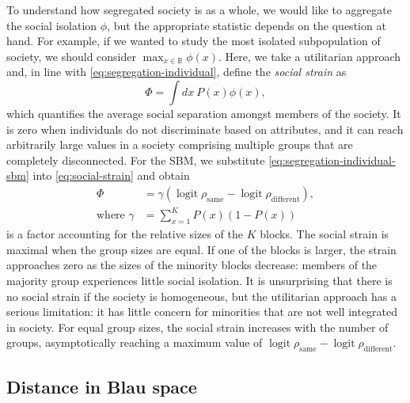 \documentclass{scrartcl}
\DeclareMathOperator{\logit}{logit}
\newcommand{\blauspace}{\mathbb{B}}
\begin{document}
To understand how segregated society is as a whole, we would like to aggregate the social isolation $\phi$, but the appropriate statistic depends on the question at hand. For example, if we wanted to study the most isolated subpopulation of society, we should consider $\max_{x\in\blauspace}\phi(x)$. Here, we take a utilitarian approach and, in line with \cref{eq:segregation-individual}, define the \emph{social strain} as
\begin{equation}
    \Phi = \int dx\ P(x) \phi(x),\label{eq:social-strain}
\end{equation}
which quantifies the average social separation amongst members of the society. It is zero when individuals do not discriminate based on attributes, and it can reach arbitrarily large values in a society comprising multiple groups that are completely disconnected. For the SBM, we substitute \cref{eq:segregation-individual-sbm} into \cref{eq:social-strain} and obtain
\begin{align}
    \Phi&= \gamma\left(\logit\rho_\mathrm{same}-\logit\rho_\mathrm{different}\right),\nonumber \\
    \text{where }\gamma&=\sum_{x=1}^K P(x) \left(1 - P(x)\right)\label{eq:segregation-distributional-factor}
\end{align}
is a factor accounting for the relative sizes of the $K$ blocks. The social strain is maximal when the group sizes are equal. If one of the blocks is larger, the strain approaches zero as the sizes of the minority blocks decrease: members of the majority group experiences little social isolation. It is unsurprising that there is no social strain if the society is homogeneous, but the utilitarian approach has a serious limitation: it has little concern for minorities that are not well integrated in society. For equal group sizes, the social strain increases with the number of groups, asymptotically reaching a maximum value of $\logit\rho_\mathrm{same}-\logit\rho_\mathrm{different}$.

\subsection{Distance in Blau space\label{sec:segregation-distance}}
\end{document}
